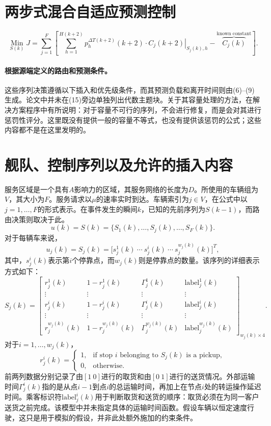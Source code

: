\documentclass[11pt]{article}
\begin{document}
\section*{两步式混合自适应预测控制}

\begin{equation}
\operatorname*{Min}_{S(k)} J
=\sum_{j=1}^{F}\left[
\sum_{h=1}^{H(k+2)}p_h^{\Delta T(k+2)}(k+2)\cdot
\left.C_j(k+2)\right|_{S_j(k),h}
-\overbrace{C_j(k)}^{\text{known constant}}
\right].
\tag{15, final line}
\end{equation}

\paragraph{根据源端定义的路由和预测条件。}
这些序列决策遵循以下插入和优先级条件，而其预测负载和离开时间则由(6)--(9)生成。论文中并未在(15)旁边单独列出代数主题块。关于其容量处理的方法，在解决方案程序中有所说明：对于容量不可行的序列，不会进行修复，而是会对其进行惩罚性评分。这里既没有提供一般的容量不等式，也没有提供该惩罚的公式；这些内容都不是在这里发明的。

\section*{舰队、控制序列以及允许的插入内容}
服务区域是一个具有$A$影响力的区域，其服务网络的长度为$D$。所使用的车辆组为$V$，其大小为$F$。服务请求以$\mu$的速率实时到达。车辆索引为$j\in V$，在公式中以$j=1,\ldots,F$的形式表示。在事件发生的瞬间$k$，已知的先前序列为$S(k-1)$，而路由决策则取决于此。
\begin{equation}
u(k)=S(k)=\{S_1(k),\ldots,S_j(k),\ldots,S_F(k)\}.
\tag{3}
\end{equation}
对于每辆车来说，
\[
u_j(k)=S_j(k)
=\bigl[s_j^1(k)\ \cdots\ s_j^i(k)\ \cdots\ s_j^{w_j(k)}(k)\bigr]^T,
\]
其中，$s_j^i(k)$表示第$i$个停靠点，而$w_j(k)$则是停靠点的数量。该序列的详细表示方式如下：
\begin{equation}
S_j(k)=
\begin{bmatrix}
r_j^1(k)&1-r_j^1(k)&\Gamma_j^1(k)&\mathrm{label}_j^1(k)\\
\vdots&\vdots&\vdots&\vdots\\
r_j^i(k)&1-r_j^i(k)&\Gamma_j^i(k)&\mathrm{label}_j^i(k)\\
\vdots&\vdots&\vdots&\vdots\\
r_j^{w_j(k)}(k)&1-r_j^{w_j(k)}(k)&\Gamma_j^{w_j(k)}(k)&\mathrm{label}_j^{w_j(k)}(k)
\end{bmatrix}_{w_j(k)\times4}.
\tag{7}
\end{equation}
对于$i=1,\ldots,w_j(k)$，
\[
r_j^i(k)=
\begin{cases}
1,&\text{if stop $i$ belonging to $S_j(k)$ is a pickup},\\
0,&\text{otherwise}.
\end{cases}
\]
前两列数据分别记录了由$[1\ 0]$进行的取货和由$[0\ 1]$进行的送货情况。外部运输时间$\Gamma_j^i(k)$指的是从点$i-1$到点$i$的总运输时间，再加上在节点$i$处的转运操作延迟时间。乘客标识符$\mathrm{label}_j^i(k)$用于判断取货和送货的顺序：取货必须在为同一客户送货之前完成。该模型中并未指定具体的运输时间函数。假设车辆以恒定速度行驶，这只是用于模拟的假设，并非此处额外施加的约束条件。
\end{document}
